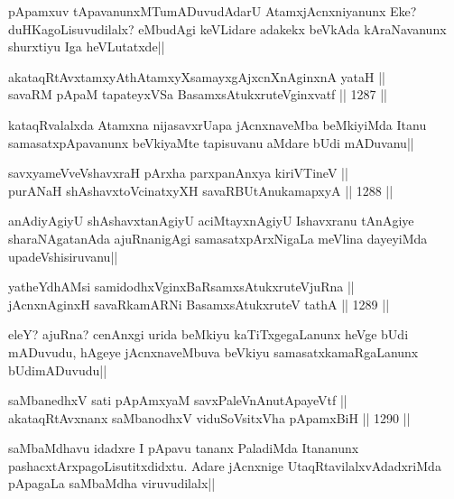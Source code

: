 \begin{artha}
pApamxuv tApavanunxMTumADuvudAdarU AtamxjAcnxniyanunx Eke? duHKagoLisuvudilalx? eMbudAgi keVLidare adakekx beVkAda kAraNavanunx shurxtiyu Iga heVLutatxde||
\end{artha}

\begin{shl}
akataqRtAvxtamxyAthAtamxyXsamayxgAjxcnXnAginxnA yataH || \\
savaRM pApaM tapateyxVSa BasamxsAtukxruteV\s ginxvatf ||  1287 ||  
\end{shl}

\begin{artha}
kataqRvalalxda Atamxna nijasavxrUapa jAcnxnaveMba beMkiyiMda Itanu samasatxpApavanunx beVkiyaMte tapisuvanu aMdare bUdi mADuvanu||
\end{artha}

\begin{shl}
savxyameVveVshavxraH pArxha parxpanAnxya kiriVTineV || \\
purANaH shAshavxtoV\s cinatxyXH savaRBUtAnukamapxyA ||  1288 ||  
\end{shl}

\begin{artha}
anAdiyAgiyU shAshavxtanAgiyU aciMtayxnAgiyU Ishavxranu tAnAgiye sharaNAgatanAda ajuRnanigAgi samasatxpArxNigaLa meVlina dayeyiMda upadeVshisiruvanu||
\end{artha}


\begin{shl}
yatheYdhAMsi samidodhxV\s ginxBaRsamxsAtukxruteV\s juRna || \\
jAcnxnAginxH savaRkamARNi BasamxsAtukxruteV tathA ||  1289 ||  
\end{shl}

\begin{artha}
eleY? ajuRna? cenAnxgi urida beMkiyu kaTiTxgegaLanunx heVge bUdi mADuvudu, hAgeye jAcnxnaveMbuva beVkiyu samasatxkamaRgaLanunx bUdimADuvudu||
\end{artha}


\begin{shl}
saMbanedhxV sati pApAmx\s yaM savxPaleVnAnutApayeVtf || \\
akataqRtAvxnanx saMbanodhxV viduSoV\s sitxVha pApamxBiH ||  1290 ||  
\end{shl}

\begin{artha}
saMbaMdhavu idadxre I pApavu tananx PaladiMda Itananunx pashacxtArxpagoLisutitxdidxtu. Adare jAcnxnige UtaqRtavilalxvAdadxriMda pApagaLa saMbaMdha viruvudilalx||
\end{artha}

